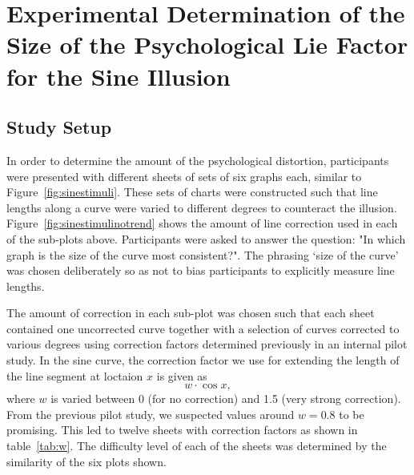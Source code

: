 \documentclass[journal]{vgtc}\usepackage{graphicx, color}
\begin{document}
\section{Experimental Determination of the Size of the Psychological Lie Factor for the Sine Illusion}
\subsection{Study Setup}
In order to determine the amount of the psychological distortion, participants were presented with different sheets of sets of six graphs each, similar to Figure~\ref{fig:sinestimuli}. These sets of charts were constructed such that line lengths along a curve were varied to different degrees to counteract the illusion. Figure~\ref{fig:sinestimulinotrend} shows the amount of line correction used in each of the sub-plots above. Participants were asked  to answer the question: "In which graph is the size of the curve most consistent?". 
The phrasing `size of the curve' was chosen deliberately so as not to bias participants to explicitly measure line lengths. 

The amount of correction in each sub-plot was chosen such that each sheet contained one uncorrected curve together with a selection of curves corrected to various degrees using correction factors determined previously in an internal pilot study. In the sine curve, the correction factor we use for extending the length of the line segment at loctaion $x$ is given as
\[
w \cdot \cos x,
\]
where $w$ is varied between 0 (for no correction) and 1.5 (very strong correction). From the previous pilot study, we suspected values around $w = 0.8$ to be promising. This led to twelve sheets with correction factors as shown in table~\ref{tab:w}. The difficulty level of each of the sheets was determined by the similarity of the six plots shown.
\end{document}
